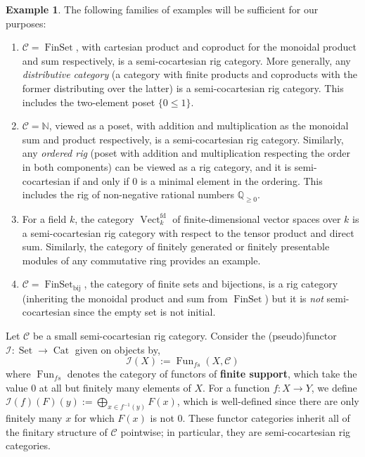 \documentclass[12pt]{article}
\theoremstyle{plain}
\theoremstyle{definition}
\newtheorem{example}[thm]{Example}
\newcommand{\bb}[1]{\mathbb{#1}}
\newcommand{\call}[1]{\mathcal{#1}}
\newcommand{\Ccal}{\call{C}}
\newcommand{\Ical}{\call{I}}
\DeclareMathOperator{\set}{Set}
\DeclareMathOperator{\finset}{FinSet}
\DeclareMathOperator{\vect}{Vect}
\DeclareMathOperator{\cat}{Cat}
\DeclareMathOperator{\Fun}{Fun}
\begin{document}
\begin{example}
\label{ex:scrig}
The following families of examples will be sufficient for our purposes:
\begin{enumerate}[label=(\alph*)]
	\item $\Ccal = \finset$, with cartesian product and coproduct for the monoidal product and sum respectively, is a semi-cocartesian rig category. More generally, any \textit{distributive category} (a category with finite products and coproducts with the former distributing over the latter) is a semi-cocartesian rig category. This includes the two-element poset $\{0 \leq 1\}$.
	\item $\Ccal = \bb{N}$, viewed as a poset, with addition and multiplication as the monoidal sum and product respectively, is a semi-cocartesian rig category. Similarly, any \textit{ordered rig} (poset with addition and multiplication respecting the order in both components) can be viewed as a rig category, and it is semi-cocartesian if and only if $0$ is a minimal element in the ordering. This includes the rig of non-negative rational numbers $\bb{Q}_{\geq 0}$.
	\item For a field $k$, the category $\vect^{\mathrm{fd}}_k$ of finite-dimensional vector spaces over $k$ is a semi-cocartesian rig category with respect to the tensor product and direct sum. Similarly, the category of finitely generated or finitely presentable modules of any commutative ring provides an example.
	\item $\Ccal = \finset_{\mathrm{bij}}$, the category of finite sets and bijections, is a rig category (inheriting the monoidal product and sum from $\finset$) but it is \textit{not} semi-cocartesian since the empty set is not initial.
\end{enumerate}
\end{example}

Let $\Ccal$ be a small semi-cocartesian rig category. Consider the (pseudo)functor $\Ical: \set \to \cat$ given on objects by,
\[\Ical(X) := \Fun_{fs}(X,\Ccal)\]
where $\Fun_{fs}$ denotes the category of functors of \textbf{finite support}, which take the value $0$ at all but finitely many elements of $X$. For a function $f:X \to Y$, we define $\Ical(f)(F)(y):= \bigoplus_{x \in f^{-1}(y)} F(x)$, which is well-defined since there are only finitely many $x$ for which $F(x)$ is not $0$. These functor categories inherit all of the finitary structure of $\Ccal$ pointwise; in particular, they are semi-cocartesian rig categories.
\end{document}

